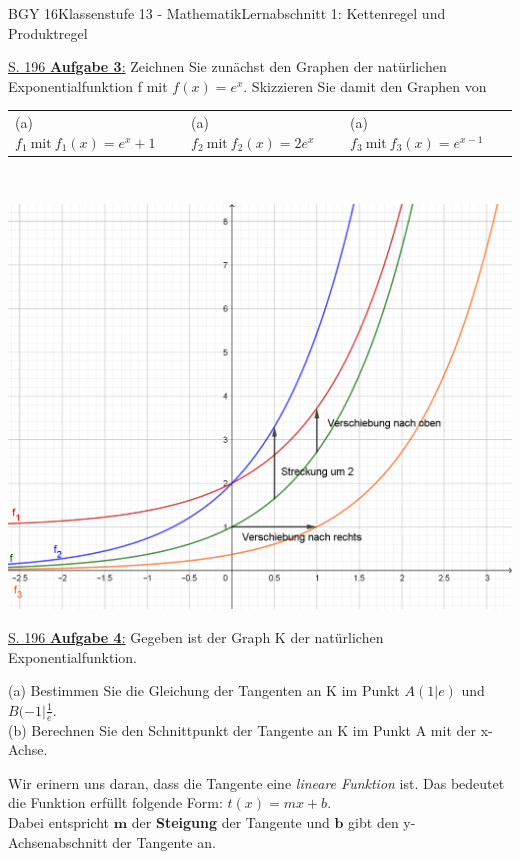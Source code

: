 \documentclass[oneside,openany,headings=optiontotoc,11pt,numbers=noenddot]{scrreprt}
\begin{document}
\begin{worksheet}{BGY 16}{Klassenstufe 13 - Mathematik}{Lernabschnitt 1: Kettenregel und Produktregel}
\begin{framed}
			\noindent
			\small{\color{codegray}\underline{S. 196 \textbf{Aufgabe 3}:}} Zeichnen Sie zunächst den Graphen der natürlichen Exponentialfunktion f mit \(f(x) = e^x\). Skizzieren Sie damit den Graphen von\\
			\par\noindent
			\begin{tabularx}{\textwidth}{MMM}
				(a) \(f_1\ \text{mit}\ f_1(x)=e^x+1\) & (a) \(f_2\ \text{mit}\ f_2(x)=2e^x\) & (a) \(f_3\ \text{mit}\ f_3(x)=e^{x-1}\)
			\end{tabularx}\\
			\par\noindent
			\includegraphics[width=\textwidth]{../99_Bilder/01_ExpFkt/20180921-3.png}
		\end{framed}
		\begin{framed}
			\noindent
			\small{\color{codegray}\underline{S. 196 \textbf{Aufgabe 4}:}} Gegeben ist der Graph K der natürlichen Exponentialfunktion.\\
			\par\noindent
			(a) Bestimmen Sie die Gleichung der Tangenten an K im Punkt \(A(1|e)\) und \(B(-1|\frac{1}{e}\).\\
			(b) Berechnen Sie den Schnittpunkt der Tangente an K im Punkt A mit der x-Achse.
			\begin{framed}
				\noindent
				Wir erinern uns daran, dass die Tangente eine \textit{lineare Funktion} ist. Das bedeutet die Funktion erfüllt folgende Form: \(t(x) = mx+b\).\\
				Dabei entspricht \(\mathbf{m}\) der \textbf{Steigung} der Tangente und \(\mathbf{b}\) gibt den y-Achsenabschnitt der Tangente an.

\end{framed}
\end{framed}
\end{worksheet}
\end{document}

